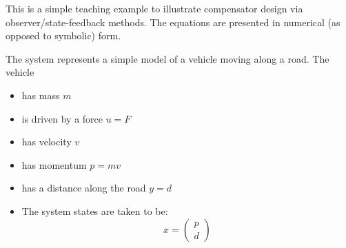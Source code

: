 

This is a simple teaching example to illustrate compensator design via
observer/state-feedback methods. The equations are presented in
numerical (as opposed to symbolic) form.

The system represents a simple model of a vehicle moving along a road.
The vehicle
\begin{itemize}
\item has mass $m$
\item is driven by a force $u=F$
\item has velocity $v$ 
\item has momentum $p=mv$ 
\item has a distance along the road $y=d$
\item The system states are taken to be:
  \begin{equation}
    x = 
    \begin{pmatrix}
      p \\ d
    \end{pmatrix}
  \end{equation}\end{itemize}

